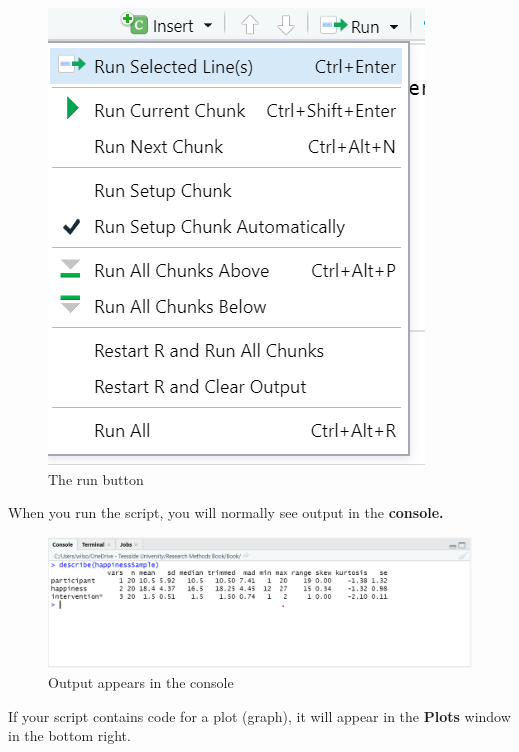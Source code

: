 \documentclass[
]{book}
\begin{document}
\begin{figure}
\centering
\includegraphics{images/run.png}
\caption{The run button}
\end{figure}

When you run the script, you will normally see output in the \textbf{console.}

\begin{figure}
\centering
\includegraphics{images/console.png}
\caption{Output appears in the console}
\end{figure}

If your script contains code for a plot (graph), it will appear in the \textbf{Plots} window in the bottom right.
\end{document}
